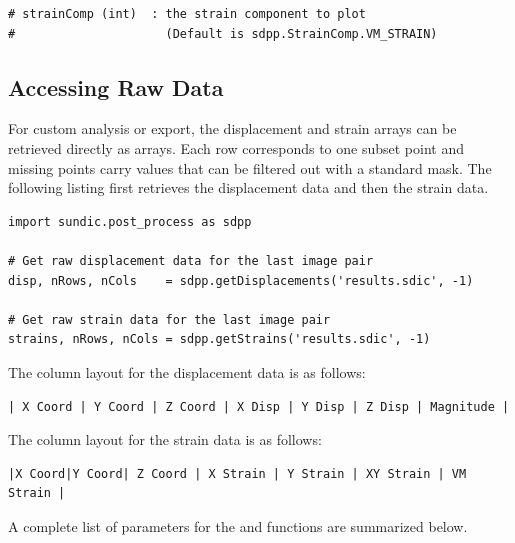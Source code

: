 \begin{lstlisting}
# strainComp (int)  : the strain component to plot
#                     (Default is sdpp.StrainComp.VM_STRAIN)
\end{lstlisting}

\subsection{Accessing Raw Data}

For custom analysis or export, the displacement and strain arrays can be retrieved
directly as  arrays.  Each row corresponds to one subset point and missing points carry  values that can be filtered out with a standard  mask.  The following listing first retrieves the displacement data and then the strain data.

\begin{lstlisting}
import sundic.post_process as sdpp

# Get raw displacement data for the last image pair
disp, nRows, nCols    = sdpp.getDisplacements('results.sdic', -1)

# Get raw strain data for the last image pair
strains, nRows, nCols = sdpp.getStrains('results.sdic', -1)
\end{lstlisting}

\noindent
The column layout for the displacement data is as follows:

\begin{lstlisting}
| X Coord | Y Coord | Z Coord | X Disp | Y Disp | Z Disp | Magnitude |
\end{lstlisting}

\noindent
The column layout for the strain data is as follows:

\begin{lstlisting}
|X Coord|Y Coord| Z Coord | X Strain | Y Strain | XY Strain | VM Strain |
\end{lstlisting}

\newpage
A complete list of parameters for the   and  functions are summarized below.

